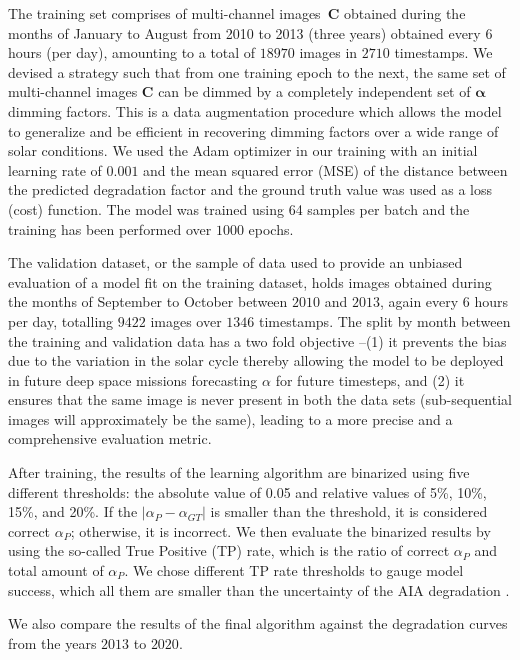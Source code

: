 \documentclass[twocolumn,usenames,dvipsnames]{aastex63}
\begin{document}
The training set comprises of multi-channel images~$\mathbf{C}$ obtained during the months of January to August from 2010 to 2013 (three years) obtained every 6 hours (per day), amounting to a total of $18970$ images in $2710$ timestamps. We devised a strategy such that from one training epoch to the next, the same set of multi-channel images $\mathbf{C}$ can be dimmed by a completely independent set of $\mathbf{\alpha}$ dimming factors. This is a data augmentation procedure which allows the model to generalize and be efficient in recovering dimming factors over a wide range of solar conditions.  We used the Adam optimizer \citep{Optimizer} in our training with an initial learning rate of $0.001$ and the mean squared error (MSE) of the distance between the predicted degradation factor and the ground truth value was used as a loss (cost) function. The model was trained using 64 samples per batch and the training has been performed over $1000$ epochs.

The validation dataset, or the sample of data used to provide an unbiased evaluation of a model fit on the training dataset, holds images obtained during the months of September to October between  $2010$ and $2013$, again every 6 hours per day, totalling $9422$ images over $1346$ timestamps. The split by month between the training and validation data has a two fold objective --(1) it prevents the bias due to the variation in the solar cycle thereby allowing the model to be deployed in future deep space missions forecasting $\alpha$ for future timesteps, and (2) it ensures that the same image is never present in both the data sets (sub-sequential images will approximately be the same), leading to a more precise and a comprehensive evaluation metric.

 After training, the results of the learning algorithm are binarized using five different thresholds: the absolute value of 0.05 and relative values of 5\%, 10\%, 15\%, and 20\%. If the $|\alpha_P - \alpha_{GT} |$ is smaller than the threshold, it is considered correct $\alpha_P$; otherwise, it is incorrect. We then evaluate the binarized results by using the so-called True Positive (TP) rate, which is the ratio of correct $\alpha_P$ and total amount of $\alpha_{P}$. We chose different TP rate thresholds to gauge model success, which all them are smaller than the uncertainty of the AIA degradation \citep[aproximately 25\%, ][]{AIA_calib_paper}.

We also compare the results of the final algorithm against the degradation curves from the years $2013$ to $2020$. 
\end{document}
